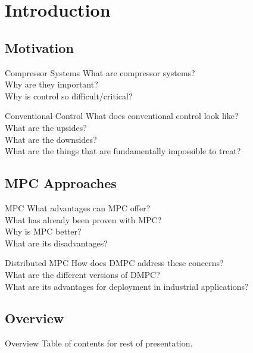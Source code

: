 \section{Introduction}

\subsection{Motivation}
\begin{frame}{Compressor Systems}
  What are compressor systems?\\
  Why are they important?\\
  Why is control so difficult/critical?\\
\end{frame}

\begin{frame}{Conventional Control}
  What does conventional control look like?\\
  What are the upsides?\\
  What are the downsides?\\
  What are the things that are fundamentally impossible to treat?
\end{frame}

\subsection{MPC Approaches}
\begin{frame}{MPC}
  What advantages can MPC offer?\\
  What has already been proven with MPC?\\
  Why is MPC better?\\
  What are its disadvantages?
\end{frame}

\begin{frame}{Distributed MPC}
  How does DMPC address these concerns?\\
  What are the different versions of DMPC?\\
  What are its advantages for deployment in industrial applications?
\end{frame}

\subsection{Overview}
\begin{frame}{Overview}
  Table of contents for rest of presentation.
\end{frame}

